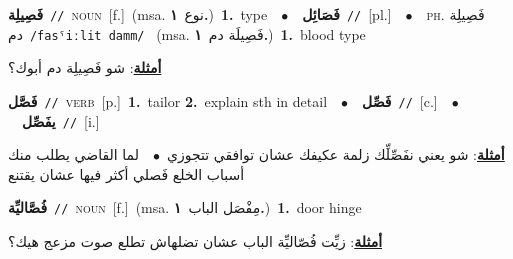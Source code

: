 \documentclass[10pt,a4paper,twoside]{article} %
\begin{document}
\begin{multicols}{2}
{\setlength\topsep{0pt}\textbf{\foreignlanguage{arabic}{فَصِيلِة}}\ {\color{gray}\texttt{//}\color{black}}\ \textsc{noun}\ [f.]\ \color{gray}(msa. \foreignlanguage{arabic}{نوع}~\foreignlanguage{arabic}{\textbf{١.}})\color{black}\ \textbf{1.}~type\ \ $\bullet$\ \ \setlength\topsep{0pt}\textbf{\foreignlanguage{arabic}{فَصَائِل}}\ {\color{gray}\texttt{//}\color{black}}\ [pl.]\ \ $\bullet$\ \ \textsc{ph.} \color{gray} \foreignlanguage{arabic}{فَصِيلِة دم}\color{black}\ {\color{gray}\texttt{/{\sffamily fasˤiːlit damm}/}\color{black}}\ \color{gray} (msa. \foreignlanguage{arabic}{فَصِيلَة دم}~\foreignlanguage{arabic}{\textbf{١.}})\color{black}\ \textbf{1.}~blood type\  \begin{flushright}\color{gray}\foreignlanguage{arabic}{\textbf{\underline{\foreignlanguage{arabic}{أمثلة}}}: شو فَصِيلِة دم أبوك؟}\end{flushright}\color{black}} \vspace{2mm}

{\setlength\topsep{0pt}\textbf{\foreignlanguage{arabic}{فَصَّل}}\ {\color{gray}\texttt{//}\color{black}}\ \textsc{verb}\ [p.]\ \textbf{1.}~tailor  \textbf{2.}~explain sth in detail\ \ $\bullet$\ \ \setlength\topsep{0pt}\textbf{\foreignlanguage{arabic}{فَصِّل}}\ {\color{gray}\texttt{//}\color{black}}\ [c.]\ \ $\bullet$\ \ \setlength\topsep{0pt}\textbf{\foreignlanguage{arabic}{يفَصِّل}}\ {\color{gray}\texttt{//}\color{black}}\ [i.]\  \begin{flushright}\color{gray}\foreignlanguage{arabic}{\textbf{\underline{\foreignlanguage{arabic}{أمثلة}}}: شو يعني نفَصِّلِّك زلمة عكيفك عشان توافقي تتجوزي\ $\bullet$\ \  لما القاضي يطلب منك أسباب الخلع فَصلي أكثر فيها عشان يقتنع}\end{flushright}\color{black}} \vspace{2mm}

{\setlength\topsep{0pt}\textbf{\foreignlanguage{arabic}{فُصَّاليِّة}}\ {\color{gray}\texttt{//}\color{black}}\ \textsc{noun}\ [f.]\ \color{gray}(msa. \foreignlanguage{arabic}{مِفْصَل الباب}~\foreignlanguage{arabic}{\textbf{١.}})\color{black}\ \textbf{1.}~door hinge\  \begin{flushright}\color{gray}\foreignlanguage{arabic}{\textbf{\underline{\foreignlanguage{arabic}{أمثلة}}}: زيِّت فُصّاليِّة الباب عشان تضلهاش تطلع صوت مزعج هيك؟}\end{flushright}\color{black}} \vspace{2mm}


\end{multicols}
\end{document}
